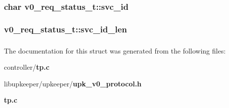 \subsubsection[{svc\_\-id}]{\setlength{\rightskip}{0pt plus 5cm}char {\bf v0\_\-req\_\-status\_\-t::svc\_\-id}}\label{structv0__req__status__t_a5334ac5b2a287a024e32ddb182ef57bb}
\subsubsection[{svc\_\-id\_\-len}]{ {\bf v0\_\-req\_\-status\_\-t::svc\_\-id\_\-len}}\label{structv0__req__status__t_a673e376191728ba8cfc74381c588e1e6}
\subsubsection[{UPK\_\-V0\_\-REQ\_\-STATUS\_\-T\_\-FIELDS}]{}\label{structv0__req__status__t_a5e646ccd5b6d1c7d28bf0642a9cdf90e}


The documentation for this struct was generated from the following files:\begin{DoxyCompactItemize}
\item 
controller/{\bf tp.c}\item 
libupkeeper/upkeeper/{\bf upk\_\-v0\_\-protocol.h}\item 
{\bf tp.c}\end{DoxyCompactItemize}
